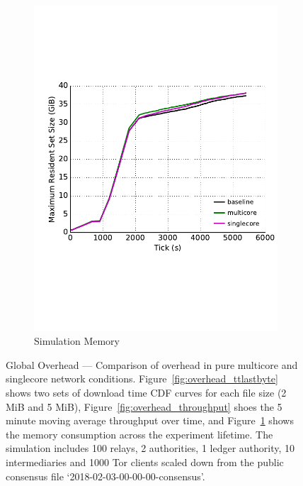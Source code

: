 \begin{figure}
\begin{subfigure}[t]{0.32\textwidth}
\includegraphics[trim={0 3cm 0 3cm}, clip, width=1.0\textwidth]{images/overhead_memory.pdf}
		\caption{Simulation Memory}
		\label{fig:overhead_shadow}
	\end{subfigure}
	\caption{Global Overhead --- Comparison of overhead in pure multicore
          and singlecore network
          conditions. Figure~\ref{fig:overhead_ttlastbyte} shows two sets of
          download time CDF curves for each file size (2 MiB and 5 MiB),
          Figure~\ref{fig:overhead_throughput} shoes the 5 minute moving average
          throughput over time, and Figure~\ref{fig:overhead_shadow} shows the
          memory consumption across the experiment lifetime. The simulation
          includes 100 relays, 2 authorities, 1 ledger authority, 10
          intermediaries and 1000 Tor clients scaled down from the public
          consensus file `2018-02-03-00-00-00-consensus'.}
	\label{fig:overhead}
\end{figure}

